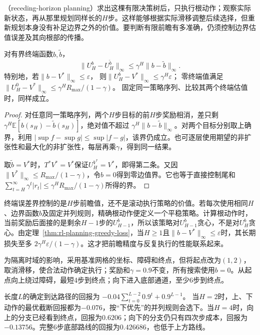 （receding-horizon planning）求出这棵有限决策树后，只执行根动作；观察实际新状态，再从那里规划同样长的$H$步。这样能够根据实际滑移调整后续选择，但重新规划本身没有补足边界之外的价值。要判断有限前瞻有多准确，仍须控制边界估值误差及其向根部的传播。

\begin{theorem}[有限前瞻的终端误差]
 \label{thm:rl-planning-terminal-error}
 对有界终端函数$b,\tilde b$，
 \[
 \lVert U_H^b-U_H^{\tilde b}\rVert_\infty
 \leq\gamma^H\lVert b-\tilde b\rVert_\infty.
 \]
 特别地，若$\lVert b-V^*\rVert_\infty\leq\varepsilon$，
 则$\lVert U_H^b-V^*\rVert_\infty\leq\gamma^H\varepsilon$；
 零终端值满足
 $\lVert U_H^0-V^*\rVert_\infty\leq\gamma^H R_{\max}/(1-\gamma)$。
 固定同一策略序列、比较其两个终端估值时，同样成立。
\end{theorem}
\begin{proof}
 对任意同一策略序列，两个$H$步目标的前$H$步奖励相消，差只剩
 $\gamma^H\mathbb E[b(s_H)-\tilde b(s_H)]$，绝对值不超过
 $\gamma^H\lVert b-\tilde b\rVert_\infty$。对两个目标分别取上确界，利用
 $|\sup f-\sup g|\leq\sup|f-g|$，该界仍成立。也可逐层使用期望的非扩张性和最大化的非扩张性，每层再乘$\gamma$，得到同一结果。

 取$\tilde b=V^*$时，$T^*V^*=V^*$保证$U_H^{V^*}=V^*$，即得第二条。又因$\lVert V^*\rVert_\infty\leq R_{\max}/(1-\gamma)$，令$b=0$得到零边值界。它也等于直接控制尾和
 $\sum_{t=H}^{\infty}\gamma^t|r_t|\leq\gamma^H R_{\max}/(1-\gamma)$所得的界。
\end{proof}

终端误差界控制的是$H$步前瞻值，还不是滚动执行策略的价值。若每次使用相同$H$、边界函数$b$及固定并列规则，精确根动作便定义一个平稳策略。计算根动作时，当前奖励后面接的是剩余$H-1$步的$U_{H-1}^b$，所以该策略对$U_{H-1}^b$贪心，不是对$U_H^b$贪心。由定理~\ref{thm:rl-planning-greedy-loss}，当$H\geq1$且$\lVert b-V^*\rVert_\infty\leq\varepsilon$时，其长期损失至多
$2\gamma^H\varepsilon/(1-\gamma)$。这才把前瞻精度与反复执行的性能联系起来。

\begin{example}[同一障碍下的短前瞻]
 \label{ex:rl-planning-detour}
 为隔离时域的影响，采用基准网格的坐标、障碍和终点，但将起点改为$(1,2)$，取消滑移，使合法动作确定执行；奖励和$\gamma=0.9$不变，所有搜索使用$b=0$。从起点向上绕过障碍，最短4步到终点；向下进入底部通道，至少6步到终点。

 长度$L$的确定到达路径的回报为
 $-0.04\sum_{t=0}^{L-2}0.9^t+0.9^{L-1}$。
 当$H=2$时，上、下动作的最优截断回报都为$-0.076$，按“下优先”的并列规则会选下。当$H=4$时，向上的分支已经看到终点，回报为$0.6206$；向下的分支仍只有四次步成本，回报为$-0.13756$。完整6步底部路线的回报为$0.426686$，也低于上方路线。
\end{example}

